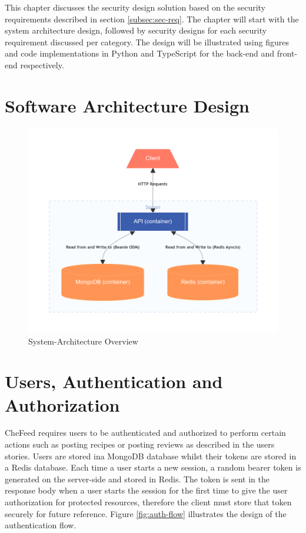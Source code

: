 This chapter discusses the security design solution based on the security requirements described in section \ref{subsec:sec-req}. The chapter will start with the system architecture design, followed by security designs for each security requirement discussed per category. The design will be illustrated using figures and code implementations in Python and TypeScript for the back-end and front-end respectively.

\section{Software Architecture Design}
\begin{figure}
    \centering
    \includegraphics[width=\textwidth]{../../img/chapter-4/system-arch.png}
    \caption{System-Architecture Overview}
    \label{fig:sys-arch}
\end{figure}

\section{Users, Authentication and Authorization}
CheFeed requires users to be authenticated and authorized to perform certain actions such as posting recipes or posting reviews as described in the users stories. Users are stored ina MongoDB database whilst their tokens are stored in a Redis database. Each time a user starts a new session, a random bearer token is generated on the server-side and stored in Redis. The token is sent in the response body when a user starts the session for the first time to give the user authorization for protected resources, therefore the client must store that token securely for future reference. Figure \ref{fig:auth-flow} illustrates the design of the authentication flow.

